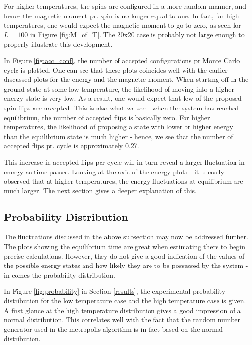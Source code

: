 \documentclass[12pt,english,a4paper]{article}
\begin{document}
For higher temperatures, the spins are configured in a more random manner, and hence the magnetic moment pr. spin is no longer equal to one. In fact, for high temperatures, one would expect the magnetic moment to go to zero, as seen for $L=100$ in Figure \ref{fig:M_of_T}. The 20x20 case is probably not large enough to properly illustrate this development. 

In Figure \ref{fig:acc_conf}, the number of accepted configurations pr Monte Carlo cycle is plotted. One can see that these plots coincides well with the earlier discussed plots for the energy and the magnetic moment. When starting off in the ground state at some low temperature, the likelihood of moving into a higher energy state is very low. As a result, one would expect that few of the proposed spin flips are accepted. This is also what we see - when the system has reached equilibrium, the number of accepted flips is basically zero. For higher temperatures, the likelihood of proposing a state with lower or higher energy than the equilibrium state is much higher - hence, we see that the number of accepted flips pr. cycle is approximately 0.27.

This increase in accepted flips per cycle will in turn reveal a larger fluctuation in energy as time passes. Looking at the axis of the energy plots - it is easily observed that at higher temperatures, the energy fluctuations at equilibrium are much larger. The next section gives a deeper explanation of this.

\subsection{Probability Distribution}
The fluctuations discussed in the above subsection may now be addressed further. The plots showing the equilibrium time are great when estimating there to begin precise calculations. However, they do not give a good indication of the values of the possible energy states and how likely they are to be possessed by the system - in comes the probability distribution.

In Figure \ref{fig:probability} in Section \ref{results}, the experimental probability distribution for the low temperature case and the high temperature case is given. A first glance at the high temperature distribution gives a good impression of a normal distribution. This correlates well with the fact that the random number generator used in the metropolis algorithm is in fact based on the normal distribution.
\end{document}
